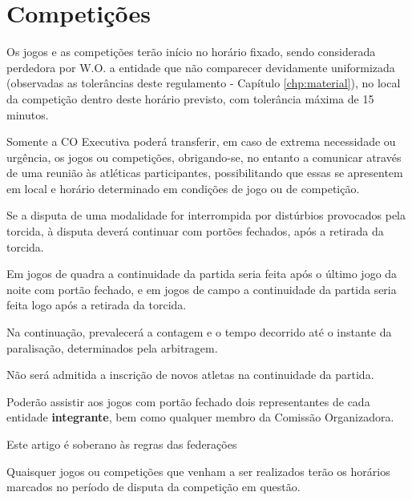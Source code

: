 {\let\clearpage\relax \chapter{Competições}}

\begin{article}
	Os jogos e as competições terão início no horário fixado, sendo considerada perdedora por W.O. a entidade que não comparecer devidamente uniformizada (observadas as tolerâncias deste regulamento - Capítulo \ref{chp:material}), no local da competição dentro deste horário previsto, com tolerância máxima de 15 minutos.
\end{article}

\begin{article}
	Somente a CO Executiva poderá transferir, em caso de extrema necessidade ou urgência, os jogos ou competições, obrigando-se, no entanto a comunicar através de uma reunião às atléticas participantes, possibilitando que essas se apresentem em local e horário determinado em condições de jogo ou de competição.
\end{article}

\begin{article}
	Se a disputa de uma modalidade for interrompida por distúrbios provocados pela torcida, à disputa deverá continuar com portões fechados, após a retirada da torcida.

	\begin{xparagraph}
		Em jogos de quadra a continuidade da partida seria feita após o último jogo da noite com portão fechado, e em jogos de campo a continuidade da partida seria feita logo após a retirada da torcida.
	\end{xparagraph}

	\begin{xparagraph}
		Na continuação, prevalecerá a contagem e o tempo decorrido até o instante da paralisação, determinados pela arbitragem.
	\end{xparagraph}

	\begin{xparagraph}
		Não será admitida a inscrição de novos atletas na continuidade da partida.
	\end{xparagraph}

	\begin{xparagraph}
		Poderão assistir aos jogos com portão fechado dois representantes de cada entidade \textbf{integrante}, bem como qualquer membro da Comissão Organizadora.
	\end{xparagraph}

	\begin{xparagraph}
		Este artigo é soberano às regras das federações
	\end{xparagraph}
\end{article}

\begin{article}
	\label{art:jogos.horario}
	Quaisquer jogos ou competições que venham a ser realizados terão os horários marcados no período de disputa da competição em questão.
\end{article}
